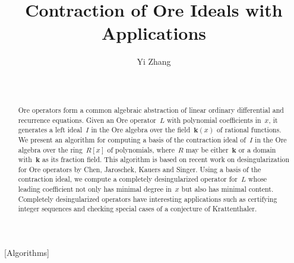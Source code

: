 \documentclass{sig-alternate}
\begin{document}
\allowdisplaybreaks

\title{Contraction of Ore Ideals with Applications}


\author{\alignauthor
 \leavevmode
 \mathstrut Yi Zhang\\[\smallskipamount]
  \\
  \\
}

\maketitle
\begin{abstract}
Ore operators form a common algebraic abstraction of linear ordinary differential and recurrence equations.
Given an Ore operator~$L$ with polynomial coefficients in~$x$, it generates a left ideal~$I$ in the Ore algebra
over the field~$\mathbf{k}(x)$ of rational functions. We present an algorithm for computing a basis of the contraction ideal of~$I$
in the Ore algebra over the ring~$R[x]$ of polynomials, where~$R$ may be either~$\mathbf{k}$ or a domain with~$\mathbf{k}$ as its fraction field.
This algorithm is based on recent work on desingularization for Ore operators by Chen, Jaroschek, Kauers and Singer.
Using a basis of the contraction ideal,
we compute a completely desingularized operator for~$L$ whose leading coefficient not only
has minimal degree in~$x$ but also has minimal content. Completely desingularized operators have interesting applications
such as certifying integer sequences and checking special cases of a conjecture of Krattenthaler.
\end{abstract}


[Algorithms]




\end{document}
